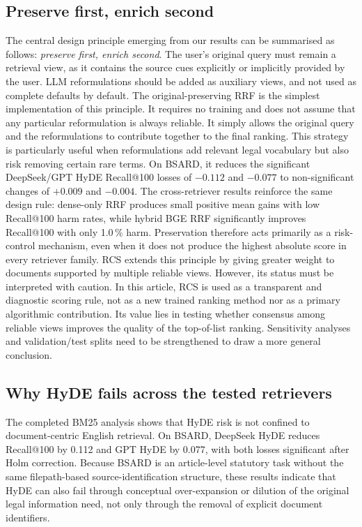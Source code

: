 \documentclass[a4paper,fleqn]{cas-dc}
\begin{document}
\subsection{Preserve first, enrich second}
\label{sec:disc-preserve-first}
The central design principle emerging from our results can be summarised as follows: \textit{preserve first, enrich second}. The user’s original query must remain a retrieval view, as it contains the source cues explicitly or implicitly provided by the user. LLM reformulations should be added as auxiliary views, and not used as complete defaults by default.
The original-preserving RRF is the simplest implementation of this principle. It requires no training and does not assume that any particular reformulation is always reliable. It simply allows the original query and the reformulations to contribute together to the final ranking. This strategy is particularly useful when reformulations add relevant legal vocabulary but also risk removing certain rare terms. On BSARD, it reduces the significant DeepSeek/GPT HyDE Recall@100 losses of $-0.112$ and $-0.077$ to non-significant changes of $+0.009$ and $-0.004$. The cross-retriever results reinforce the same design rule: dense-only RRF produces small positive mean gains with low Recall@100 harm rates, while hybrid BGE RRF significantly improves Recall@100 with only 1.0\,\% harm. Preservation therefore acts primarily as a risk-control mechanism, even when it does not produce the highest absolute score in every retriever family.
RCS extends this principle by giving greater weight to documents supported by multiple reliable views. However, its status must be interpreted with caution. In this article, RCS is used as a transparent and diagnostic scoring rule, not as a new trained ranking method nor as a primary algorithmic contribution. Its value lies in testing whether consensus among reliable views improves the quality of the top-of-list ranking. Sensitivity analyses and validation/test splits need to be strengthened to draw a more general conclusion.
\subsection{Why HyDE fails across the tested retrievers}
\label{sec:disc-hyde}

The completed BM25 analysis shows that HyDE risk is not confined
to document-centric English retrieval. On BSARD, DeepSeek HyDE
reduces Recall@100 by 0.112 and GPT HyDE by 0.077, with both
losses significant after Holm correction. Because BSARD is an
article-level statutory task without the same filepath-based
source-identification structure, these results indicate that
HyDE can also fail through conceptual over-expansion or dilution
of the original legal information need, not only through the
removal of explicit document identifiers.
\end{document}
